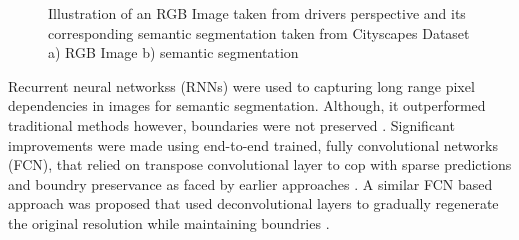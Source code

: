 \begin{figure}[!htb]
    \caption[RGB Image and Semantic Segmentation]{Illustration of an RGB Image taken from drivers perspective and its corresponding semantic segmentation taken from Cityscapes Dataset a) RGB Image b) semantic segmentation \cite{Cordts2015}}
    \label{fig:rgb_semseg}
\end{figure}

Recurrent neural networkss (RNNs) were used to capturing long range pixel dependencies in images for semantic segmentation. Although, it outperformed traditional methods however, boundaries were not preserved \cite{Pinheiro2014}. Significant improvements were made using end-to-end trained, fully convolutional networks (FCN), that relied on transpose convolutional layer to cop with sparse predictions and boundry preservance as faced by earlier approaches \cite{Long2015}. A similar FCN based approach was proposed that used deconvolutional layers to gradually regenerate the original resolution while maintaining boundries \cite{Noh2015}. 
 
